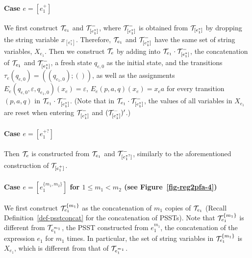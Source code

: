 \paragraph{Case $e = [e_1^{+}]$}  We first construct $\mathcal{T}_{e_1}$ and $\mathcal{T}^-_{[e^\ast_1]}$, where $\mathcal{T}^-_{[e^\ast_1]}$ is obtained from $\mathcal{T}_{[e^\ast_1]}$ by dropping the string variable $x_{[e^\ast_1]}$. Therefore, $\mathcal{T}_{e_1}$ and $\mathcal{T}^-_{[e^\ast_1]}$ have the same set of string variables, $X_{e_1}$. Then we construct $\mathcal{T}_{e}$ by adding into $\mathcal{T}_{e_1} \cdot \mathcal{T}^-_{[e^\ast_1]}$, the concatenation of $\mathcal{T}_{e_1}$ and $\mathcal{T}^-_{[e^\ast_1]}$, a fresh state $q_{e,0}$ as the initial state, and the transitions $\tau_e(q_{e,0}) = ((q_{e_1,0});())$, as well as the assignments $E_e(q_{e,0}, \varepsilon, q_{e_1,0})(x_e) = \varepsilon$, $E_e(p, a, q)(x_e) = x_e a$ for every transition $(p, a, q)$ in $\mathcal{T}_{e_1} \cdot \mathcal{T}^-_{[e^\ast_1]}$. (Note that in $\mathcal{T}_{e_1} \cdot \mathcal{T}^-_{[e^\ast_1]}$, the values of all variables in $X_{e_1}$ are reset when entering $ \mathcal{T}^-_{[e^\ast_1]}$ and $(\mathcal{T}^-_{[e^\ast_1]})'$.)

		

 
\paragraph{Case $e = [e_1^{+?}]$} Then $\mathcal{T}_e$ is constructed from $\mathcal{T}_{e_1}$ and $\mathcal{T}^-_{[e^{\ast?}_1]}$, similarly to the aforementioned construction of $\mathcal{T}_{[e_1^{+}]}$.


\paragraph{Case $e = [e_1^{\{m_1,m_2\}}]$ for $1 \le m_1 < m_2$ (see Figure~\ref{fig-reg2pfa-4})} We first construct $\mathcal{T}^{\{m_1\}}_{e_1}$ as the concatenation of $m_1$ copies of $\mathcal{T}_{e_1}$ (Recall Definition~\ref{def-psstconcat} for the concatenation of PSSTs). Note that $\mathcal{T}^{\{m_1\}}_{e_1}$ is different from $\mathcal{T}_{e_1^{m_1}}$, the PSST constructed from $e_1^{m_1}$, the concatenation of the expression $e_1$ for $m_1$ times. In particular, the set of string variables in $\mathcal{T}^{\{m_1\}}_{e_1}$ is $X_{e_1}$, which is different from that of $\mathcal{T}_{e_1^{m_1}}$. 

